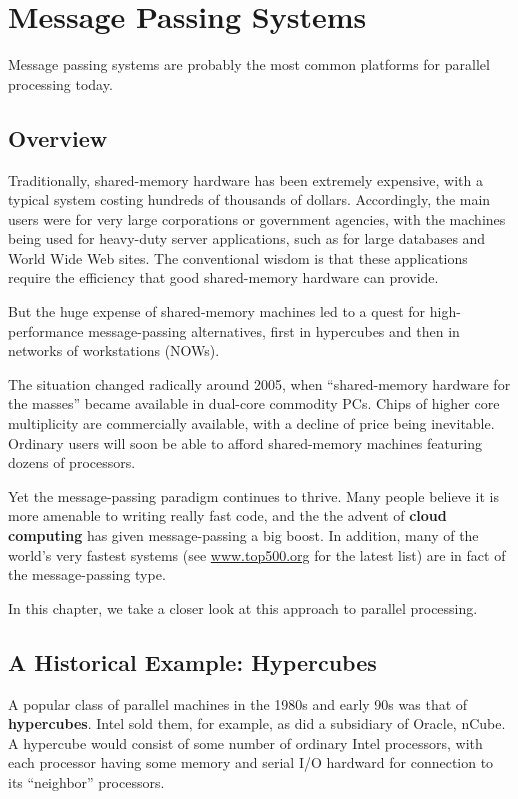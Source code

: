 \chapter{Message Passing Systems}
\label{chap:msg}

Message passing systems are probably the most common platforms for
parallel processing today.

\section{Overview}

Traditionally, shared-memory hardware has been extremely expensive, with
a typical system costing hundreds of thousands of dollars.  Accordingly,
the main users were for very large corporations or government agencies,
with the machines being used for heavy-duty server applications, such as
for large databases and World Wide Web sites. The conventional wisdom is
that these applications require the efficiency that good shared-memory
hardware can provide. 

But the huge expense of shared-memory machines led to a quest for
high-performance message-passing alternatives, first in hypercubes and
then in networks of workstations (NOWs).

The situation changed radically around 2005, when ``shared-memory
hardware for the masses'' became available in dual-core commodity PCs.
Chips of higher core multiplicity are commercially available, with a
decline of price being inevitable.  Ordinary users will soon be able to
afford shared-memory machines featuring dozens of processors.

Yet the message-passing paradigm continues to thrive.  Many people
believe it is more amenable to writing really fast code, and the the
advent of {\bf cloud computing} has given message-passing a big boost.
In addition, many of the world's very fastest systems (see
\url{www.top500.org} for the latest list) are in fact of the
message-passing type.

In this chapter, we take a closer look at this approach to parallel
processing.

\section{A Historical Example:  Hypercubes}

A popular class of parallel machines in the 1980s and early 90s was that
of \textbf{hypercubes}.  Intel sold them, for example, as did a
subsidiary of Oracle, nCube.  A hypercube would consist of some number
of ordinary Intel processors, with each processor having some memory and
serial I/O hardward for connection to its ``neighbor'' processors.

